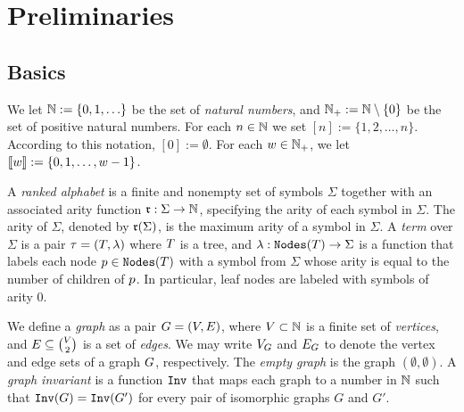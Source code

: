 \section{Preliminaries}

\subsection{Basics}
We let $\mathbb{N}:= \{0,1, \ldots \}$ be the set of {\em natural numbers}, 
and $\mathbb{N}_+:= \mathbb{N} \setminus \{0\}$ be the set of positive natural numbers. 
For each $n \in \mathbb{N}$ we set $[n]:=\{1,2, \ldots,n\}$. According to this notation,
$[0]:= \emptyset$. For each $w \in \mathbb{N}_+$, we let $\llbracket w \rrbracket:= \{0,1,\ldots,
w-1\}$. 


A \emph{ranked alphabet} is a finite and nonempty set of symbols $\Sigma$ together with an associated arity function $\mathfrak{r} : \Sigma \rightarrow \mathbb{N}$, specifying the arity of each symbol in $\Sigma$. The arity of $\Sigma$, denoted by $\mathfrak{r}(\Sigma)$, is the
maximum arity of a symbol in $\Sigma$. A \emph{term} over $\Sigma$ is a pair $\tau = (T, \lambda)$ where $T$ is a tree, and $\lambda: \texttt{Nodes}(T) \rightarrow \Sigma$ is a function that labels each node $p \in \texttt{Nodes}(T)$ with a symbol from $\Sigma$ whose arity is equal to the number of children of $p$. In particular, leaf nodes are labeled with symbols of arity $0$. 

We define a \emph{graph} as a pair $G = (V,E)$, where $V \subset \mathbb{N}$ is a finite set of \emph{vertices}, and $E \subseteq \binom{V}{2}$ is a set of \emph{edges}.
We may write $V_G$ and $E_G$ to denote the vertex and edge sets of a graph $G$, respectively. The \emph{empty graph} is the graph $(\emptyset,\emptyset)$.
A \emph{graph invariant} is a function $\texttt{Inv}$ that maps each graph to a number in $\mathbb{N}$ such that $\texttt{Inv}(G) = \texttt{Inv}(G')$ for every pair of isomorphic graphs $G$ and $G'$. 



